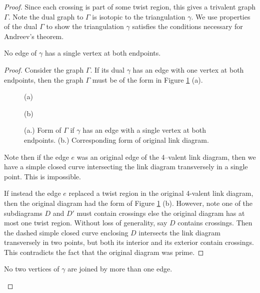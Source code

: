 \begin{proof}
Since each crossing is part of some twist region, this gives a
trivalent graph $\Gamma$.
Note the dual graph to $\Gamma$ is isotopic to the triangulation
$\gamma$.
We use properties of the dual $\Gamma$ to show the triangulation
$\gamma$ satisfies the conditions necessary for Andreev's theorem.

\begin{lemma}
  No edge of $\gamma$ has a single vertex at both endpoints.
  \label{lemma:andreev1}
\end{lemma}

\begin{proof}
Consider the graph $\Gamma$.  If its dual $\gamma$ has an edge with one
vertex at both endpoints, then the graph $\Gamma$ must be of the form
in Figure \ref{fig:Andr_double_end} (a).

\begin{figure}
  \begin{center}
    (a)
  
  \hspace{.5in}
  (b)
  
  \end{center}
  \caption{(a.) Form of $\Gamma$ if $\gamma$ has an edge
    with a single vertex at both endpoints.  (b.)  Corresponding form
    of original link diagram.  }
  \label{fig:Andr_double_end}
\end{figure}

Note then if the edge $e$ was an original edge of the 4--valent link
diagram, then we have a simple closed curve intersecting the link
diagram transversely in a single point.  This is impossible.

If instead the edge $e$ replaced a twist region in the original
4-valent link diagram, then the original diagram had the form of
Figure \ref{fig:Andr_double_end} (b).  However, note one of the
subdiagrams $D$ and $D'$ must contain crossings else the original
diagram has at most one twist region.  Without loss of generality, say
$D$ contains crossings.  Then the dashed simple closed curve enclosing
$D$ intersects the link diagram transversely in two points, but both
its interior and its exterior contain crossings.  This contradicts the
fact that the original diagram was prime.
\end{proof}

\begin{lemma}
  No two vertices of $\gamma$ are joined by more than one edge. 
  \label{lemma:andreev2}
\end{lemma}


\end{proof}
